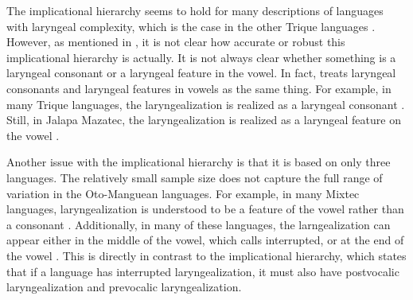 The implicational hierarchy seems to hold for many descriptions of languages with laryngeal complexity, which is the case in the other Trique languages \citep{dicanioPhoneticsPhonologySan2008,dicanioItunyosoTrique2010,dicanioCoarticulationToneGlottal2012,dicanioPhoneticsFortisLenis2012,dicanioCueWeightPerception2014,dicanioGlottalTogglingItunyoso2020,elliottChicahuaxtlaTriqui2016,hollenbachPhonologyMorphologyTone1984}. However, as mentioned in \citet{frazierPhoneticsYucatecMaya2013}, it is not clear how accurate or robust this implicational hierarchy is actually. It is not always clear whether something is a laryngeal consonant or a laryngeal feature in the vowel. In fact, \citet{silvermanLaryngealComplexityOtomanguean1997,silvermanPhasingRecoverability1997} treats laryngeal consonants and laryngeal features in vowels as the same thing. For example, in many Trique languages, the laryngealization is realized as a laryngeal consonant \citep{dicanioPhoneticsPhonologySan2008,dicanioItunyosoTrique2010,dicanioCoarticulationToneGlottal2012,dicanioPhoneticsFortisLenis2012,dicanioCueWeightPerception2014,dicanioGlottalTogglingItunyoso2020,elliottChicahuaxtlaTriqui2016,hollenbachPhonologyMorphologyTone1984}. Still, in Jalapa Mazatec, the laryngealization is realized as a laryngeal feature on the vowel \citep{kirkQuantifyingAcousticProperties1993,garellekAcousticConsequencesPhonation2011}. 

Another issue with the implicational hierarchy is that it is based on only three languages. The relatively small sample size does not capture the full range of variation in the Oto-Manguean languages. For example, in many Mixtec languages, laryngealization is understood to be a feature of the vowel rather than a consonant \citep[e.g.,][]{cortesSanSebastianMonte2023,eischensTonePhonationPhonologyPhonetics2022,gerfenPhonologyPhoneticsCoatzospan1999,gerfenProductionPerceptionLaryngealized2005}. Additionally, in many of these languages, the larngealization can appear either in the middle of the vowel, which \citet{silvermanLaryngealComplexityOtomanguean1997} calls interrupted, or at the end of the vowel \citep[e.g.,][]{cortesSanSebastianMonte2023,eischensTonePhonationPhonologyPhonetics2022}. This is directly in contrast to the implicational hierarchy, which states that if a language has interrupted laryngealization, it must also have postvocalic laryngealization and prevocalic laryngealization.

